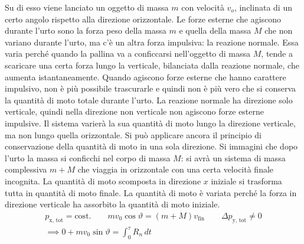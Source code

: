 \documentclass[10pt,a4paper]{book}
\begin{document}
\FloatBarrier
Su di esso viene lanciato un oggetto di massa $m$ con velocità $v_o$, inclinata di un certo angolo rispetto alla direzione orizzontale. Le forze esterne che agiscono durante l'urto sono la forza peso della massa $m$ e quella della massa $M$ che non variano durante l'urto, ma c'è un altra forza impulsiva: la reazione normale. Essa varia perché quando la pallina va a conficcarsi nell'oggetto di massa $M$,  tende a scaricare una certa forza lungo la verticale, bilanciata dalla reazione normale, che aumenta istantaneamente. Quando agiscono forze esterne che hanno carattere impulsivo, non è più possibile trascurarle e quindi non è più vero che si conserva la quantità di moto totale durante l'urto. La reazione normale ha direzione solo verticale, quindi nella direzione non verticale non agiscono forze esterne impulsive. Il sistema varierà la sua quantità di moto lungo la direzione verticale, ma non lungo quella orizzontale. Si può applicare ancora il principio di conservazione della quantità di moto in una sola direzione. Si immagini che dopo l'urto la massa si conficchi nel corpo di massa $M$: si avrà un sistema di massa complessiva $m+M$ che viaggia in orizzontale con una certa velocità finale incognita. La quantità di moto scomposta in direzione $x$ iniziale si trasforma tutta in quantità di moto finale. La quantità di moto è variata perché la forza in direzione verticale ha assorbito la quantità di moto iniziale.
\begin{gather*}
	p_\text{x, tot}=\text{cost.} \qquad mv_0\cos\vartheta=(m+M)v_\text{fin} \qquad \Delta p_\text{y, tot} \ne 0 \\
	\implies 0+mv_0\sin\vartheta=\int_0^\tau R_n \, dt
\end{gather*}
\end{document}
